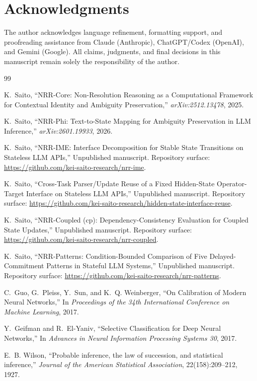\documentclass[11pt,a4paper]{article}
\begin{document}
\section*{Acknowledgments}

The author acknowledges language refinement, formatting support, and
proofreading assistance from Claude (Anthropic), ChatGPT/Codex (OpenAI), and
Gemini (Google). All claims, judgments, and final decisions in this manuscript
remain solely the responsibility of the author.

\begin{thebibliography}{99}
\raggedright

K.~Saito,
\newblock ``NRR-Core: Non-Resolution Reasoning as a Computational Framework for Contextual Identity and Ambiguity Preservation,''
\newblock \emph{arXiv:2512.13478}, 2025.

K.~Saito,
\newblock ``NRR-Phi: Text-to-State Mapping for Ambiguity Preservation in LLM Inference,''
\newblock \emph{arXiv:2601.19933}, 2026.

K.~Saito,
\newblock ``NRR-IME: Interface Decomposition for Stable State Transitions on Stateless LLM APIs,''
\newblock Unpublished manuscript. Repository surface:
\url{https://github.com/kei-saito-research/nrr-ime}.

K.~Saito,
\newblock ``Cross-Task Parser/Update Reuse of a Fixed Hidden-State Operator-Target Interface on Stateless LLM APIs,''
\newblock Unpublished manuscript. Repository surface:
\url{https://github.com/kei-saito-research/hidden-state-interface-reuse}.

K.~Saito,
\newblock ``NRR-Coupled (cp): Dependency-Consistency Evaluation for Coupled State Updates,''
\newblock Unpublished manuscript. Repository surface:
\url{https://github.com/kei-saito-research/nrr-coupled}.

K.~Saito,
\newblock ``NRR-Patterns: Condition-Bounded Comparison of Five Delayed-Commitment Patterns in Stateful LLM Systems,''
\newblock Unpublished manuscript. Repository surface:
\url{https://github.com/kei-saito-research/nrr-patterns}.

C.~Guo, G.~Pleiss, Y.~Sun, and K.~Q. Weinberger,
\newblock ``On Calibration of Modern Neural Networks,''
\newblock In \emph{Proceedings of the 34th International Conference on Machine Learning}, 2017.

Y.~Geifman and R.~El-Yaniv,
\newblock ``Selective Classification for Deep Neural Networks,''
\newblock In \emph{Advances in Neural Information Processing Systems 30}, 2017.

E.~B. Wilson,
\newblock ``Probable inference, the law of succession, and statistical inference,''
\newblock \emph{Journal of the American Statistical Association}, 22(158):209--212, 1927.

\end{thebibliography}
\end{document}
